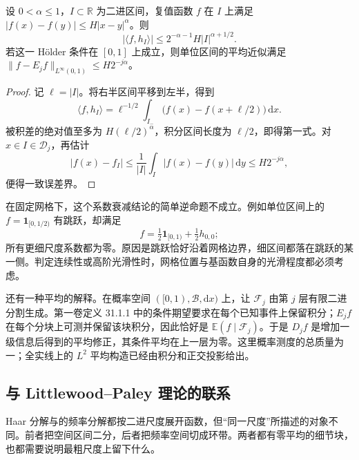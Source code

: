 \begin{proposition}\label{b2:prop:19-haar-holder}
设 \(0<\alpha\leq1\)，\(I\subset\mathbb R\) 为二进区间，复值函数 \(f\) 在 \(I\) 上满足
\(|f(x)-f(y)|\leq H|x-y|^\alpha\)。则
\begin{equation}\label{b2:eq:19-haar-holder-bound}
 |\langle f,h_I\rangle|
 \leq 2^{-\alpha-1}H|I|^{\alpha+1/2}.
\end{equation}
若这一 Hölder 条件在 \([0,1]\) 上成立，则单位区间的平均近似满足
\(\|f-E_jf\|_{L^\infty(0,1)}\leq H2^{-j\alpha}\)。
\end{proposition}
\begin{proof}
记 \(\ell=|I|\)。将右半区间平移到左半，得到
\[
 \langle f,h_I\rangle
 =\ell^{-1/2}\int_{I_-}
 \bigl(f(x)-f(x+\ell/2)\bigr)\,\mathrm dx.
\]
被积差的绝对值至多为 \(H(\ell/2)^\alpha\)，积分区间长度为 \(\ell/2\)，即得第一式。对 \(x\in I\in\mathcal D_j\)，再估计
\[
 |f(x)-f_I|
 \leq\frac1{|I|}\int_I|f(x)-f(y)|\,\mathrm dy
 \leq H2^{-j\alpha},
\]
便得一致误差界。
\end{proof}

在固定网格下，这个系数衰减结论的简单逆命题不成立。例如单位区间上的 \(f=\mathbf1_{[0,1/2)}\) 有跳跃，却满足
\[
 f=\tfrac12\mathbf1_{[0,1)}+\tfrac12h_{0,0};
\]
所有更细尺度系数都为零。原因是跳跃恰好沿着网格边界，细区间都落在跳跃的某一侧。判定连续性或高阶光滑性时，网格位置与基函数自身的光滑程度都必须考虑。

还有一种平均的解释。在概率空间 \(([0,1),\mathcal B,\mathrm dx)\) 上，让 \(\mathcal F_j\) 由第 \(j\) 层有限二进分割生成。第一卷定义 31.1.1 中的条件期望要求在每个已知事件上保留积分；\(E_jf\) 在每个分块上可测并保留该块积分，因此恰好是 \(\mathbb E(f\mid\mathcal F_j)\)。于是 \(D_jf\) 是增加一级信息后得到的平均修正，其条件平均在上一层为零。这里概率测度的总质量为一；全实线上的 \(L^2\) 平均构造已经由积分和正交投影给出。

\subsection{与 Littlewood–Paley 理论的联系}
\label{b2:subsec:190604}

Haar 分解与的频率分解都按二进尺度展开函数，但“同一尺度”所描述的对象不同。前者把空间区间二分，后者把频率空间切成环带。两者都有零平均的细节块，也都需要说明最粗尺度上留下什么。

